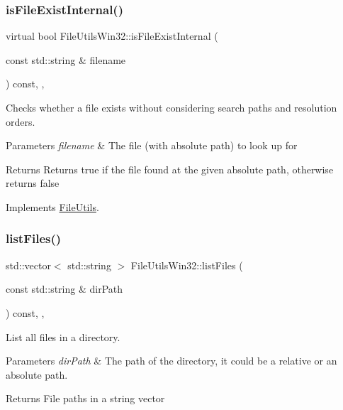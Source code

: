 \subsubsection{\texorpdfstring{is\+File\+Exist\+Internal()}{isFileExistInternal()}\hspace{0.1cm}{\footnotesize\ttfamily [2/2]}}
{\footnotesize\ttfamily virtual bool File\+Utils\+Win32\+::is\+File\+Exist\+Internal (\begin{DoxyParamCaption}\item[{const std\+::string \&}]{filename }\end{DoxyParamCaption}) const\hspace{0.3cm}{\ttfamily [override]}, {\ttfamily [protected]}, {\ttfamily [virtual]}}

Checks whether a file exists without considering search paths and resolution orders. 
\begin{DoxyParams}{Parameters}
{\em filename} & The file (with absolute path) to look up for \\
\hline
\end{DoxyParams}
\begin{DoxyReturn}{Returns}
Returns true if the file found at the given absolute path, otherwise returns false 
\end{DoxyReturn}


Implements \hyperlink{classFileUtils_a0e1dc78cbe5ac5689e1f67ebd4413bab}{File\+Utils}.

\mbox{\label{classFileUtilsWin32_aa7a02a2d86383277ea72b7581da0b5db}} 
\subsubsection{\texorpdfstring{list\+Files()}{listFiles()}}
{\footnotesize\ttfamily std\+::vector$<$ std\+::string $>$ File\+Utils\+Win32\+::list\+Files (\begin{DoxyParamCaption}\item[{const std\+::string \&}]{dir\+Path }\end{DoxyParamCaption}) const\hspace{0.3cm}{\ttfamily [override]}, {\ttfamily [protected]}, {\ttfamily [virtual]}}

List all files in a directory.


\begin{DoxyParams}{Parameters}
{\em dir\+Path} & The path of the directory, it could be a relative or an absolute path. \\
\hline
\end{DoxyParams}
\begin{DoxyReturn}{Returns}
File paths in a string vector 
\end{DoxyReturn}



